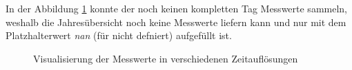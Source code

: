 In der Abbildung \ref{4times} konnte der  noch keinen kompletten Tag Messwerte sammeln, weshalb die Jahresübersicht noch keine Messwerte liefern kann und nur mit dem Platzhalterwert \textit{nan} (für nicht defniert) aufgefüllt ist.

\begin{figure}[ht]
	\centering
		\caption{Visualisierung der Messwerte in verschiedenen Zeitauflösungen}
		\label{4times}
\end{figure}

